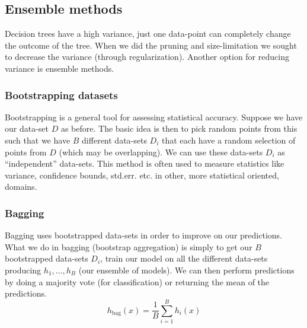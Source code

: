     \subsection{Ensemble methods}
    Decision trees have a high variance, just one data-point can completely 
    change the outcome of the tree. When we did the pruning and size-limitation 
    we sought to decrease the variance (through regularization). Another option 
    for reducing variance is ensemble methods.
    
    \subsubsection{Bootstrapping datasets}
    Bootstrapping is a general tool for assessing statistical accuracy. Suppose 
    we have our data-set $D$ as before. The basic idea is then to pick random 
    points from this such that we have $B$ different data-sets $D_i$ that each 
    have a random selection of points from $D$ (which may be overlapping). We 
    can use these data-sets $D_i$ as ``independent'' data-sets. This method is 
    often used to measure statistics like variance, confidence bounds, std.err. 
    etc. in other, more statistical oriented, domains.
    
    \subsubsection{Bagging}
    Bagging uses bootstrapped data-sets in order to improve on our predictions. 
    What we do in bagging (bootstrap aggregation) is simply to get our $B$ 
    bootstrapped data-sets $D_i$, train our model on all the different 
    data-sets producing $h_1,\dots,h_B$ (our ensemble of models). We can then 
    perform predictions by doing a majority vote (for classification) or 
    returning the mean of the predictions.
    \begin{equation*}
        h_{\text{bag}}(x)=\frac{1}{B}\sum_{i=1}^{B} h_i(x)
    \end{equation*}
    
    
    
